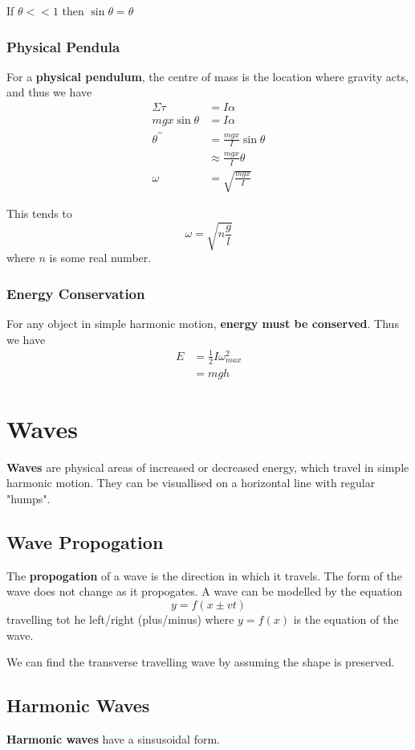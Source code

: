 \documentclass[12pt]{article}
\begin{document}
If $\theta << 1$ then $\sin\theta = \theta$

\subsubsection*{Physical Pendula}
For a {\bf physical pendulum}, the centre of mass is the location where gravity acts, and thus we have
\begin{align*}
\Sigma\tau &= I\alpha\\
mgx\sin\theta &= I\alpha\\
\theta^{\prime\prime} &= \frac{mgx}{I}\sin\theta\\
&\approx \frac{mgx}{I}\theta\\
\omega &= \sqrt{\frac{mgx}{I}}
\end{align*}

This tends to \[ \omega = \sqrt{n\frac{g}{l}} \] where $n$ is some real number.

\subsubsection*{Energy Conservation}
For any object in simple harmonic motion, {\bf energy must be conserved}. Thus we have
\begin{align*}
E &= \frac{1}{2}I\omega_{max}^2\\
&= mgh
\end{align*}

\section*{Waves}
{\bf Waves} are physical areas of increased or decreased energy, which travel in simple harmonic motion. They can be visuallised on a horizontal line with regular "humps".

\subsection*{Wave Propogation}
The {\bf propogation} of a wave is the direction in which it travels. The form of the wave does not change as it propogates. A wave can be modelled by the equation \[ y = f(x\pm vt) \] travelling tot he left/right (plus/minus) where $y = f(x)$ is the equation of the wave. 

We can find the transverse travelling wave by assuming the shape is preserved.

\subsection*{Harmonic Waves}
{\bf Harmonic waves} have a sinsusoidal form.
\end{document}
